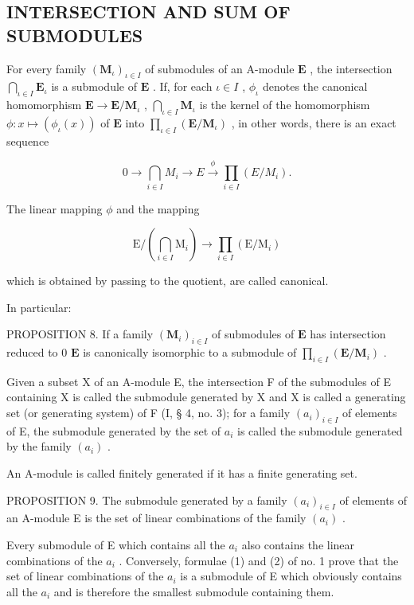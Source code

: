 \subsection{INTERSECTION AND SUM OF SUBMODULES}

For every family \((\mathbf{M}_{\iota})_{\iota \in I}\) of submodules of an A-module \(\mathbf{E}\) , the intersection \(\bigcap_{\iota \in I} \mathbf{E}_{\iota}\) is a submodule of \(\mathbf{E}\) . If, for each \(\iota \in I\) , \(\phi_{\iota}\) denotes the canonical homomorphism \(\mathbf{E} \to \mathbf{E} / \mathbf{M}_{\iota}\) , \(\bigcap_{\iota \in I} \mathbf{M}_{\iota}\) is the kernel of the homomorphism \(\phi: x \mapsto (\phi_{\iota}(x))\) of \(\mathbf{E}\) into \(\prod_{\iota \in I} (\mathbf{E} / \mathbf{M}_{\iota})\) , in other words, there is an exact sequence

\[
0 \longrightarrow \bigcap_ {i \in I} M _ {i} \longrightarrow E \stackrel {\phi} {\longrightarrow} \prod_ {i \in I} (E / M _ {i}).\tag{27}
\]

The linear mapping \(\phi\) and the mapping

\[
\mathrm{E} / \left(\bigcap_ {i \in I} \mathrm{M} _ {i}\right)\rightarrow \prod_ {i \in I} (\mathrm{E} / \mathrm{M} _ {i})
\]

which is obtained by passing to the quotient, are called canonical.

In particular:

PROPOSITION 8. If a family \((\mathbf{M}_i)_{i\in I}\) of submodules of \(\mathbf{E}\) has intersection reduced to 0 \(\mathbf{E}\) is canonically isomorphic to a submodule of \(\prod_{i\in I}(\mathbf{E}/\mathbf{M}_i)\) .

Given a subset X of an A-module E, the intersection F of the submodules of E containing X is called the submodule generated by X and X is called a generating set (or generating system) of F (I, § 4, no. 3); for a family \((a_{i})_{i\in I}\) of elements of E, the submodule generated by the set of \(a_{i}\) is called the submodule generated by the family \((a_{i})\) .

An A-module is called finitely generated if it has a finite generating set.

PROPOSITION 9. The submodule generated by a family \((a_{i})_{i\in I}\) of elements of an A-module E is the set of linear combinations of the family \((a_{i})\) .

Every submodule of E which contains all the \(a_{i}\) also contains the linear combinations of the \(a_{i}\) . Conversely, formulae (1) and (2) of no. 1 prove that the set of linear combinations of the \(a_{i}\) is a submodule of E which obviously contains all the \(a_{i}\) and is therefore the smallest submodule containing them.


